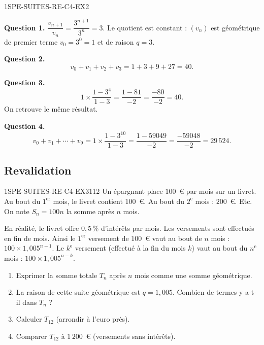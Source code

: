 
\begin{corrige}{1SPE-SUITES-RE-C4-EX2}


\textbf{Question 1.} $\dfrac{v_{n+1}}{v_n} = \dfrac{3^{n+1}}{3^n} = 3$. Le quotient est constant : $(v_n)$ est géométrique de premier terme $v_0 = 3^0 = 1$ et de raison $q = 3$.

\textbf{Question 2.}
\[
v_0 + v_1 + v_2 + v_3 = 1 + 3 + 9 + 27 = 40.
\]


\textbf{Question 3.}
\[
1 \times \frac{1 - 3^4}{1 - 3} = \frac{1 - 81}{-2} = \frac{-80}{-2} = 40.
\]
On retrouve le même résultat. \checkmark

\textbf{Question 4.}
\[
v_0 + v_1 + \cdots + v_9 = 1 \times \frac{1 - 3^{10}}{1 - 3} = \frac{1 - 59049}{-2} = \frac{-59048}{-2} = 29\,524.
\]

\end{corrige}

\subsection*{Revalidation}


\begin{exercice}{1SPE-SUITES-RE-C4-EX3}{1}{12}
Un épargnant place $100$~€ par mois sur un livret. Au bout du $1^{\text{er}}$ mois, le livret contient $100$~€. Au bout du $2^{\text{e}}$ mois : $200$~€. Etc. On note $S_n = 100n$ la somme après $n$ mois.

En réalité, le livret offre $0{,}5\,\%$ d'intérêts par mois. Les versements
sont effectués en fin de mois. Ainsi le $1^{\text{er}}$ versement de $100$~€
vaut au bout de $n$ mois : $100 \times 1{,}005^{n-1}$. Le $k^{\text{e}}$
versement (effectué à la fin du mois $k$) vaut au bout du $n^{\text{e}}$ mois :
$100 \times 1{,}005^{n-k}$.
\begin{enumerate}
  \item Exprimer la somme totale $T_n$ après $n$ mois comme une somme géométrique.
  \item La raison de cette suite géométrique est $q = 1{,}005$. Combien de termes y a-t-il dans $T_n$ ?
  \item Calculer $T_{12}$ (arrondir à l'euro près).
  \item Comparer $T_{12}$ à $1\,200$~€ (versements sans intérêts).
\end{enumerate}
\end{exercice}

